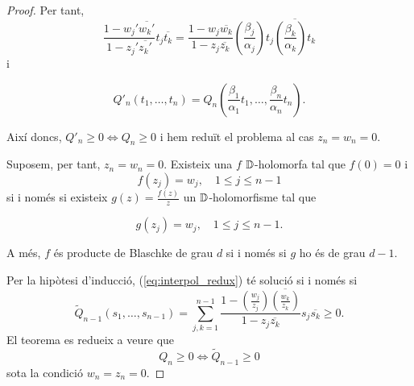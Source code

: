 \documentclass[dvipsnames, svgnames, leqno, a4paper, 12pt]{article}
\begin{document}
\begin{proof}
Per tant, 
\begin{displaymath}
    \frac{1-w_j'\overline{w_k'}}{1-z_j'\overline{z_k'}}t_j\overline{t_k}=\frac{1-w_j\overline{w_k}}{1-z_j\overline{z_k}}\left( \frac{\beta_j}{\alpha_j} \right)t_j\overline{\left( \frac{\beta_k}{\alpha_k} \right)t_k}
\end{displaymath}
i 

\begin{equation}
    Q'_n(t_1,\dots,t_n)=Q_n\left(\frac{\beta_1}{\alpha_1}t_1,\dots,\frac{\beta_n}{\alpha_n}t_n\right).
\end{equation}

Així doncs, $Q'_n\geq0 \iff Q_n\geq0$ i hem reduït el problema al cas $z_n=w_n=0$.

Suposem, per tant, $z_n=w_n=0$. Existeix una $f$ $\mathbb{D}$-holomorfa tal que $f(0)=0$ i 
\begin{displaymath}
    f(z_j)=w_j,\quad 1\leq j \leq n-1
\end{displaymath}
si i només si existeix $g(z)=\frac{f(z)}{z}$ un $\mathbb{D}$-holomorfisme tal que 

\begin{equation}\label{eq:interpol_redux}
    g(z_j)=w_j,\quad 1\leq j\leq n-1.
\end{equation}

A més, $f$ és producte de Blaschke de grau $d$ si i només si $g$ ho és de grau $d-1$.

Per la hipòtesi d'inducció, (\ref{eq:interpol_redux}) té solució si i només si 
\begin{displaymath}
    \tilde{Q}_{n-1}(s_1,\dots,s_{n-1})=\sum_{j,k=1}^{n-1}\frac{1-\left( \frac{w_j}{z_j} \right)\overline{\left( \frac{w_k}{z_k} \right)}}{1-z_j\overline{z_k}}s_j\overline{s_k}\geq0.
\end{displaymath}
El teorema es redueix a veure que 
\begin{displaymath}
    Q_n\geq0\iff\tilde{Q}_{n-1}\geq0
\end{displaymath}
sota la condició $w_n=z_n=0$.


\end{proof}
\end{document}
